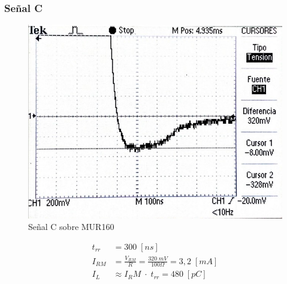 \documentclass{article}
\begin{document}
\subsubsection{Señal C}
\begin{figure}[h]
 \begin{center}
	\includegraphics[scale=0.5]{imagenes/MUR_C.jpg} 
	\caption{Señal C sobre MUR160}
 \end{center}
\end{figure}
%
\begin{align*}
	t_{rr} &= 300 \; [ns] \\
	I_{RM}	&= \frac{V_{RM}}{R} = \frac{320 \; mV}{100 \Omega} = 3,2 \; [mA] \\
	I_L	&\approx {I_RM} \; \cdot \; t_{rr} = 480 \; [pC]
\end{align*}
%
\end{document}
